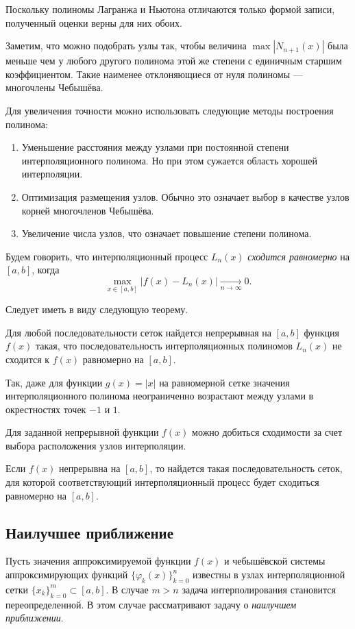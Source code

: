 Поскольку полиномы Лагранжа и Ньютона отличаются только формой записи,
полученный оценки верны для них обоих.

Заметим, что можно подобрать узлы так, чтобы величина
$\max|N_{n+1}(x)|$ была меньше чем у любого другого полинома этой же
степени с единичным старшим коэффициентом. Такие наименее
отклоняющиеся от нуля полиномы --- многочлены Чебышёва.

Для увеличения точности можно использовать следующие методы построения
полинома:
\begin{enumerate}
\item Уменьшение расстояния между узлами при постоянной степени интерполяционного
полинома. Но при этом сужается область хорошей интерполяции.
\item Оптимизация размещения узлов. Обычно это означает выбор в
  качестве узлов корней многочленов Чебышёва.
\item Увеличение числа узлов, что означает повышение степени полинома.
\end{enumerate}

Будем говорить, что интерполяционный процесс $L_{n}(x)$ \emph{сходится
  равномерно} на $[a,b]$, когда
\[
\max_{x\in[a,b]}|f(x)-L_{n}(x)|\underset{n\rightarrow\infty}{\longrightarrow}0.
\]


Следует иметь в виду следующую теорему.
\begin{thm}
\emph{}Для любой последовательности сеток найдется непрерывная на
$[a,b]$ функция $f(x)$ такая, что последовательность интерполяционных
полиномов $L_{n}(x)$ не сходится к $f(x)$ равномерно на $[a,b]$.
\end{thm}
Так, даже для функции $g(x)=|x|$ на равномерной сетке значения интерполяционного
полинома неограниченно возрастают между узлами в окрестностях точек
$-1$ и $1$.

Для заданной непрерывной функции $f(x)$ можно добиться сходимости
за счет выбора расположения узлов интерполяции.
\begin{thm}
\emph{}Если $f(x)$ непрерывна на $[a,b]$, то найдется такая
последовательность сеток, для которой соответствующий интерполяционный
процесс будет сходиться равномерно на $[a,b]$.
\end{thm}

\subsection{Наилучшее приближение}

Пусть значения аппроксимируемой функции $f(x)$ и чебышёвской системы
аппроксимирующих функций $\{\varphi_{k}(x)\}_{k=0}^{n}$ известны в
узлах интерполяционной сетки $\{x_{k}\}_{k=0}^{m}\subset[a,b]$.  В
случае $m>n$ задача интерполирования становится переопределенной.  В
этом случае рассматривают задачу о \emph{наилучшем
  приближении}.

